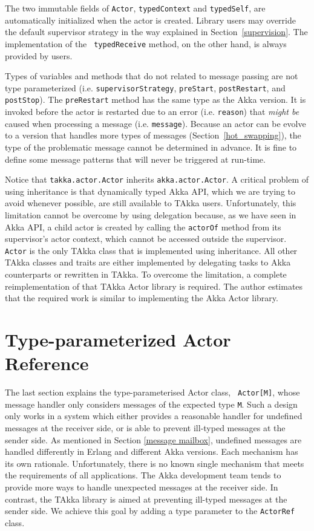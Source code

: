 The two immutable fields of {\tt Actor}, {\tt typedContext} and 
{\tt typedSelf}, are automatically initialized when the actor is created.
Library users may override the default supervisor strategy in the
way explained in Section~\ref{supervision}.  The implementation of the {\tt
typedReceive} method, on the other hand, is always provided by users.

Types of variables and methods that do not related to message passing are not
type parameterized (i.e. {\tt supervisorStrategy}, {\tt preStart}, {\tt postRestart}, and {\tt postStop}).
The {\tt preRestart} method has the same type as the Akka version.  It is invoked before the
actor is restarted due to an error (i.e. {\tt reason}) that {\it might be} caused when processing a message (i.e. {\tt message}).
Because an actor can be evolve to a version that handles more types of messages (Section~\ref{hot_swapping}),
the type of the problematic message cannot be determined in advance.  It is fine to
define some message patterns that will never be triggered at run-time.


Notice that {\tt takka.actor.Actor} inherits {\tt akka.actor.Actor}.  A 
critical problem of using inheritance is that dynamically typed 
Akka API, which we are trying to avoid whenever possible, are still available 
to TAkka users.  Unfortunately, this limitation cannot be overcome by using 
delegation because, as we have seen in Akka API, a child actor is created by 
calling the {\tt actorOf} method from its supervisor's actor context, which 
cannot be accessed outside the supervisor. {\tt Actor} is the only TAkka 
class that is implemented using inheritance. All other TAkka classes and traits 
are either implemented by delegating tasks to Akka counterparts or rewritten in 
TAkka.  To overcome the limitation, a complete reimplementation of that TAkka
Actor library is required.  The author estimates that the required work is
similar to implementing the Akka Actor library.


\section{Type-parameterized Actor Reference}
\label{takka_actor_ref}

The last section explains the type-parameterised Actor class, {\tt  
Actor[M]}, whose message handler only considers messages of the expected 
type {\tt M}.  Such a design only works in a system which either provides a 
reasonable handler for undefined messages at the receiver side,  or is able to 
prevent ill-typed messages at the sender side.  As mentioned in Section 
\ref{message mailbox}, undefined messages are handled differently in Erlang and 
different Akka versions.  Each mechanism has its own rationale.  
Unfortunately, there is no known single mechanism that meets the requirements of 
all applications.  The Akka development team tends to provide more ways to 
handle unexpected messages at the receiver side.  In contrast,  the TAkka 
library is aimed at preventing ill-typed messages at the sender side.  
We achieve this goal by adding a type parameter to the {\tt ActorRef} class.

